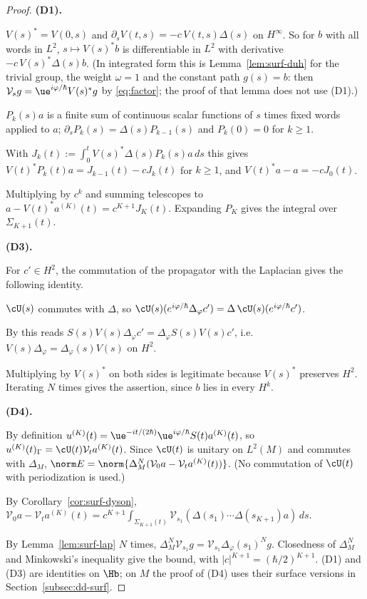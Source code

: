 \begin{proof}
\medskip\noindent\textbf{(D1).}

$V(s)^*=V(0,s)$ and $\partial_sV(t,s)=-c\,V(t,s)\Delta(s)$ on $H^\infty$. So for $b$ with all words in $L^2$, $s\mapsto V(s)^*b$ is
differentiable in $L^2$ with derivative $-c\,V(s)^*\Delta(s)b$. (In integrated form this is Lemma~\ref{lem:surf-duh} for the trivial
group, the weight $\omega=1$ and the constant path $g(s)=b$: then $\mathcal V_sg=\ue^{i\varphi/\hbar}V(s)^*g$ by \eqref{eq:factor}; the proof
of that lemma does not use (D1).)

$P_k(s)a$ is a finite sum of continuous scalar functions of $s$ times fixed words applied to $a$; $\partial_sP_k(s)=\Delta(s)P_{k-1}(s)$
and $P_k(0)=0$ for $k\ge1$.

With $J_k(t):=\int_0^tV(s)^*\Delta(s)P_k(s)a\,ds$ this gives $V(t)^*P_k(t)a=J_{k-1}(t)-cJ_k(t)$ for $k\ge1$, and $V(t)^*a-a=-cJ_0(t)$.

Multiplying by $c^k$ and summing telescopes to $a-V(t)^*a^{(K)}(t)=c^{K+1}J_K(t)$. Expanding $P_K$ gives the integral over $\Sigma_{K+1}(t)$.

\medskip\noindent\textbf{(D3).}

For $c'\in H^2$, the commutation of the propagator with the Laplacian gives the following identity.

$\cU(s)$ commutes with $\Delta$, so $\cU(s)(e^{i\varphi/\hbar}\Delta_\varphi c')=\Delta\,\cU(s)(e^{i\varphi/\hbar}c')$.

By \cite[(1.23)]{S} this reads $S(s)V(s)\Delta_\varphi c'=\Delta_\varphi S(s)V(s)c'$, i.e. $V(s)\Delta_\varphi=\Delta_\varphi(s)V(s)$ on $H^2$.

Multiplying by $V(s)^*$ on both sides is legitimate because $V(s)^*$ preserves $H^2$. Iterating $N$ times gives the assertion, since $b$ lies in every $H^k$.

\medskip\noindent\textbf{(D4).}

By definition $u^{(K)}(t)=\ue^{-it/(2\hbar)}\ue^{i\varphi/\hbar}S(t)a^{(K)}(t)$, so $u^{(K)}(t)_\Gamma=\cU(t)\mathcal V_ta^{(K)}(t)$. Since $\cU(t)$ is unitary on $L^2(M)$ and commutes with $\Delta_M$, $\norm E=\norm{\Delta_M^N(\mathcal V_0a-\mathcal V_ta^{(K)}(t))}$. (No commutation of $\cU(t)$ with periodization is used.)

By Corollary~\ref{cor:surf-dyson}, $\mathcal V_0a-\mathcal V_ta^{(K)}(t)=c^{K+1}\int_{\Sigma_{K+1}(t)}\mathcal V_{s_1}(\Delta(s_1)\cdots\Delta(s_{K+1})a)\,ds$.

By Lemma~\ref{lem:surf-lap} $N$ times, $\Delta_M^N\mathcal V_{s_1}g=\mathcal V_{s_1}\Delta_\varphi(s_1)^Ng$. Closedness of $\Delta_M^N$ and Minkowski's inequality give the bound, with $|c|^{K+1}=(\hbar/2)^{K+1}$.
(D1) and (D3) are identities on $\Hb$; on $M$ the proof of (D4) uses their surface versions in Section~\ref{subsec:dd-surf}. \qedhere
\end{proof}

